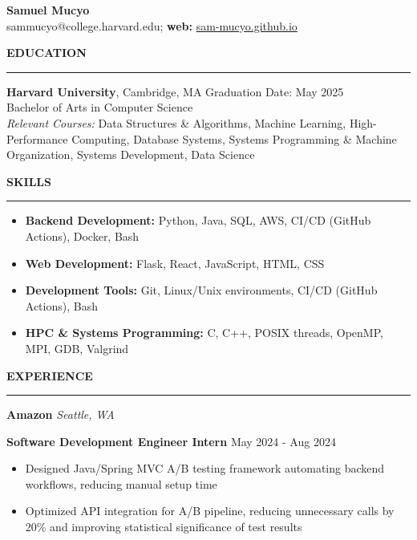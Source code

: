 \documentclass[11pt,a4paper]{article}
\newcommand{\sectionheading}[1]{\vspace{0.2cm}\textbf{\Large #1}\vspace{0.1cm}\hrule\vspace{0.3cm}}
\newcommand{\subheading}[1]{\textbf{#1}}
\newcommand{\daterange}[1]{\hfill{#1}}
\begin{document}
\begin{center}
    \textbf{\LARGE Samuel Mucyo}\\
    \vspace{0.3cm}
    sammucyo@college.harvard.edu; \textbf{web:} \href{https://sam-mucyo.github.io/}{sam-mucyo.github.io} \\
\end{center}


\sectionheading{EDUCATION}
\subheading{Harvard University}, Cambridge, MA \daterange{Graduation Date: May 2025}\\
Bachelor of Arts in Computer Science\\
\textit{Relevant Courses:} Data Structures \& Algorithms, Machine Learning, High-Performance Computing, Database Systems, Systems Programming \& Machine Organization, Systems Development, Data Science

\sectionheading{SKILLS}
\begin{itemize}[leftmargin=*,nosep]
    \item \textbf{Backend Development:} Python, Java, SQL, AWS, CI/CD (GitHub Actions), Docker, Bash
    \item \textbf{Web Development:} Flask, React, JavaScript, HTML, CSS
    \item \textbf{Development Tools:} Git, Linux/Unix environments, CI/CD (GitHub Actions), Bash
    \item \textbf{HPC \& Systems Programming:} C, C++, POSIX threads, OpenMP, MPI, GDB, Valgrind
\end{itemize}

\sectionheading{EXPERIENCE}
\subheading{Amazon} \hfill \textit{Seattle, WA}

\textbf{Software Development Engineer Intern} \hfill \daterange{May 2024 - Aug 2024}
\begin{itemize}[leftmargin=*,nosep]
    \item Designed Java/Spring MVC A/B testing framework automating backend workflows, reducing manual setup time
    \item Optimized API integration for A/B pipeline, reducing unnecessary calls by 20\% and improving statistical significance of test results
\end{itemize}
\end{document}
